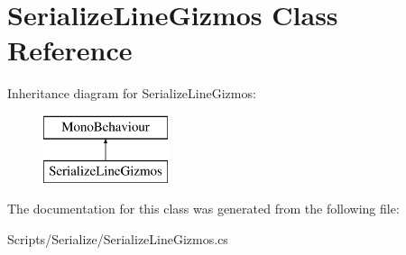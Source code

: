 \hypertarget{class_serialize_line_gizmos}{}\section{Serialize\+Line\+Gizmos Class Reference}
\label{class_serialize_line_gizmos}
Inheritance diagram for Serialize\+Line\+Gizmos\+:\begin{figure}[H]
\begin{center}
\leavevmode
\includegraphics[height=2.000000cm]{class_serialize_line_gizmos}
\end{center}
\end{figure}


The documentation for this class was generated from the following file\+:\begin{DoxyCompactItemize}
\item 
Scripts/\+Serialize/Serialize\+Line\+Gizmos.\+cs\end{DoxyCompactItemize}
